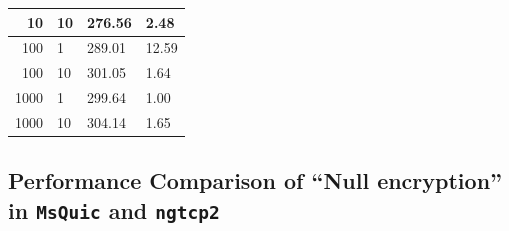 \documentclass[12pt,a4paper,twoside,openright]{report}
\begin{document}
\begin{table}[H]
\begin{tabular}{|r|l|l|l|}
10                                                                                               & 10                                                                                          & 276.56                                                                                                                                 & 2.48                                                                                                \\ \hline
100                                                                                              & 1                                                                                           & 289.01                                                                                                                                 & 12.59                                                                                               \\ \hline
100                                                                                              & 10                                                                                          & 301.05                                                                                                                                 & 1.64                                                                                                \\ \hline
1000                                                                                             & 1                                                                                           & 299.64                                                                                                                                 & 1.00                                                                                                \\ \hline
1000                                                                                             & 10                                                                                          & 304.14                                                                                                                                 & 1.65                                                                                                \\ \hline
\end{tabular}
\end{table}

\subsection{Performance Comparison of \enquote{Null encryption} in \texttt{MsQuic} and \texttt{ngtcp2}}
\end{document}
